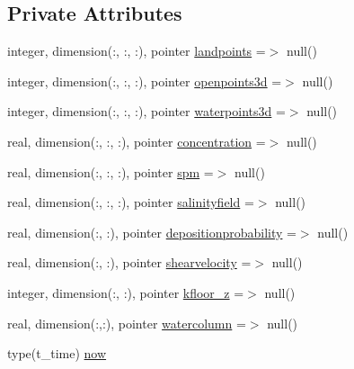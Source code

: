 \subsection*{Private Attributes}
\begin{DoxyCompactItemize}
\item 
integer, dimension(\+:, \+:, \+:), pointer \mbox{\hyperlink{structmodulefreeverticalmovement_1_1t__external_a0590f11387c33a5f85af9dcaab183757}{landpoints}} =$>$ null()
\item 
integer, dimension(\+:, \+:, \+:), pointer \mbox{\hyperlink{structmodulefreeverticalmovement_1_1t__external_a2925e564edd657457061ccfaebd0c033}{openpoints3d}} =$>$ null()
\item 
integer, dimension(\+:, \+:, \+:), pointer \mbox{\hyperlink{structmodulefreeverticalmovement_1_1t__external_a63f62d6b1667f77087744d696f801356}{waterpoints3d}} =$>$ null()
\item 
real, dimension(\+:, \+:, \+:), pointer \mbox{\hyperlink{structmodulefreeverticalmovement_1_1t__external_a0745d990f09dfe49d4b4b83a37afe13c}{concentration}} =$>$ null()
\item 
real, dimension(\+:, \+:, \+:), pointer \mbox{\hyperlink{structmodulefreeverticalmovement_1_1t__external_ac9d04209269dd509b84ba6f5ee849cdf}{spm}} =$>$ null()
\item 
real, dimension(\+:, \+:, \+:), pointer \mbox{\hyperlink{structmodulefreeverticalmovement_1_1t__external_ad8f6f17556b6f6b0c81698433b083fb8}{salinityfield}} =$>$ null()
\item 
real, dimension(\+:, \+:), pointer \mbox{\hyperlink{structmodulefreeverticalmovement_1_1t__external_a616da3bd3674eb9a1719df902b4deefa}{depositionprobability}} =$>$ null()
\item 
real, dimension(\+:, \+:), pointer \mbox{\hyperlink{structmodulefreeverticalmovement_1_1t__external_add86facd1bad60dcfcf45258538d1449}{shearvelocity}} =$>$ null()
\item 
integer, dimension(\+:, \+:), pointer \mbox{\hyperlink{structmodulefreeverticalmovement_1_1t__external_acadcfb9f83367bd122a87ca1795d1353}{kfloor\+\_\+z}} =$>$ null()
\item 
real, dimension(\+:,\+:), pointer \mbox{\hyperlink{structmodulefreeverticalmovement_1_1t__external_aa87981703772f23df0c00468b4b25ef4}{watercolumn}} =$>$ null()
\item 
type(t\+\_\+time) \mbox{\hyperlink{structmodulefreeverticalmovement_1_1t__external_a6e60abd0b05f3c7a76c474a927445f8c}{now}}
\item 

\end{DoxyCompactItemize}
